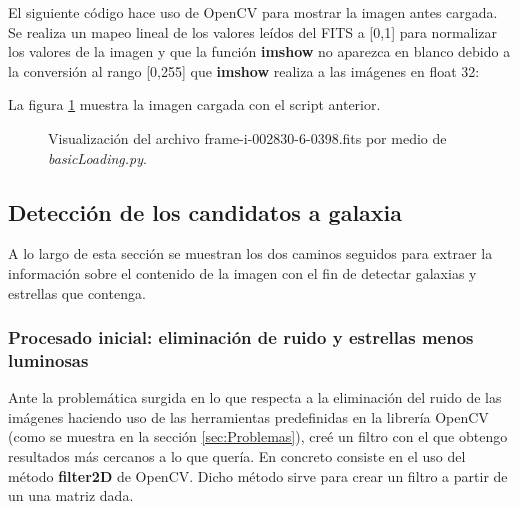 \documentclass[a4paper,12pt]{article}
\begin{document}
El siguiente código hace uso de OpenCV para mostrar la imagen antes cargada. Se realiza un mapeo lineal de los valores leídos del FITS a [0,1] para normalizar los valores de la imagen y que la función \textbf{imshow} no aparezca en blanco debido a la conversión al rango [0,255] que \textbf{imshow}\cite{imshow} realiza a las imágenes en float 32:



La figura \ref{fig:img1} muestra la imagen cargada con el script anterior.
\begin{figure}[h!]
\centering
{}
\caption{Visualización del archivo frame-i-002830-6-0398.fits por medio de \textit{basicLoading.py}.}
\label{fig:img1}
\end{figure}

\subsection{Detección de los candidatos a galaxia}
A lo largo de esta sección se muestran los dos caminos seguidos para extraer la información sobre el contenido de la imagen con el fin de detectar galaxias y estrellas que contenga.
\subsubsection{Procesado inicial: eliminación de ruido y estrellas menos luminosas}

Ante la problemática surgida en lo que respecta a la eliminación del ruido de las imágenes haciendo uso de las herramientas predefinidas en la librería OpenCV (como se muestra en la sección \ref{sec:Problemas}), creé un filtro con el que obtengo resultados más cercanos a lo que quería. En concreto consiste en el uso del método \textbf{filter2D}\cite{filter2d} de OpenCV. Dicho método sirve para crear un filtro a partir de un una matriz dada.
\end{document}
